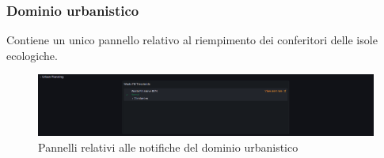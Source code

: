 \documentclass[8pt]{article}
\begin{document}
\subsubsection{Dominio urbanistico}
Contiene un unico pannello relativo al riempimento dei conferitori delle isole ecologiche.
\begin{figure}[H]
    \centering
    \includegraphics[width=15cm]{images_mu/urban_thresholds.png}
    \caption{Pannelli relativi alle notifiche del dominio urbanistico}
    \label{fig:Pannelli relativi alle notifiche del dominio urbanistico}
\end{figure}
\end{document}
